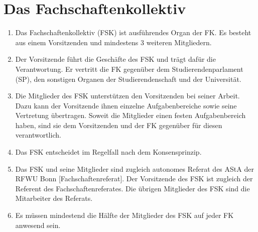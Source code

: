 \documentclass{article}
\begin{document}
\section{Das Fachschaftenkollektiv}
\begin{enumerate}[(1)]
    \item Das Fachschaftenkollektiv (FSK) ist ausführendes Organ der FK.
    	Es besteht aus einem Vorsitzenden und mindestens 3 weiteren Mitgliedern.
    \item Der Vorsitzende führt die Geschäfte des FSK und trägt dafür die Verantwortung. 
    	Er vertritt die FK gegenüber dem Studierendenparlament (SP), den sonstigen Organen der Studierendenschaft und der Universität.
    \item Die Mitglieder des FSK unterstützen den Vorsitzenden bei seiner Arbeit.
    	Dazu kann der Vorsitzende ihnen einzelne Aufgabenbereiche sowie seine Vertretung übertragen.
    	Soweit die Mitglieder einen festen Aufgabenbereich haben, sind sie dem Vorsitzenden und der FK gegenüber für diesen verantwortlich.
    \item Das FSK entscheidet im Regelfall nach dem Konsensprinzip.
    \item Das FSK und seine Mitglieder sind zugleich autonomes Referat des AStA der RFWU Bonn [Fachschaftenreferat].
    	Der Vorsitzende des FSK ist zugleich der Referent des Fachschaftenreferates.
    		Die übrigen Mitglieder des FSK sind die Mitarbeiter des Referats.
    \item Es müssen mindestend die Hälfte der Mitglieder des FSK auf jeder FK anwesend sein.
\end{enumerate}
\end{document}
